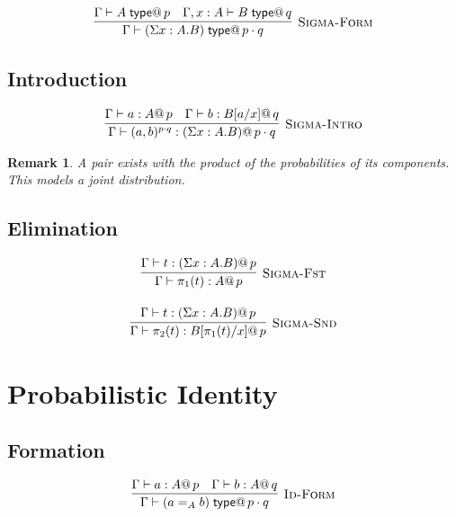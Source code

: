 \documentclass[11pt,a4paper]{article}
\makeatletter
\newtheorem{remark}{Remark}[section]
\newcommand{\type}{\;\mathsf{type}}
\newcommand{\pmark}[1]{@\, #1}  %
\makeatother
\begin{document}
\begin{gather}
\infer[\textsc{Sigma-Form}]
  {\Gamma \vdash (\Sigma x : A. B) \type \pmark{p \cdot q}}
  {\Gamma \vdash A \type \pmark{p} & \Gamma, x : A \vdash B \type \pmark{q}}
\end{gather}

\subsection{Introduction}

\begin{gather}
\infer[\textsc{Sigma-Intro}]
  {\Gamma \vdash (a, b)^{p \cdot q} : (\Sigma x : A. B) \pmark{p \cdot q}}
  {\Gamma \vdash a : A \pmark{p} & \Gamma \vdash b : B[a/x] \pmark{q}}
\end{gather}

\begin{remark}
A pair exists with the product of the probabilities of its components. This models a joint distribution.
\end{remark}

\subsection{Elimination}

\begin{gather}
\infer[\textsc{Sigma-Fst}]
  {\Gamma \vdash \pi_1(t) : A \pmark{p}}
  {\Gamma \vdash t : (\Sigma x : A. B) \pmark{p}}
\\[1em]
\infer[\textsc{Sigma-Snd}]
  {\Gamma \vdash \pi_2(t) : B[\pi_1(t)/x] \pmark{p}}
  {\Gamma \vdash t : (\Sigma x : A. B) \pmark{p}}
\end{gather}

\section{Probabilistic Identity}

\subsection{Formation}

\begin{gather}
\infer[\textsc{Id-Form}]
  {\Gamma \vdash (a =_A b) \type \pmark{p \cdot q}}
  {\Gamma \vdash a : A \pmark{p} & \Gamma \vdash b : A \pmark{q}}
\end{gather}
\end{document}
